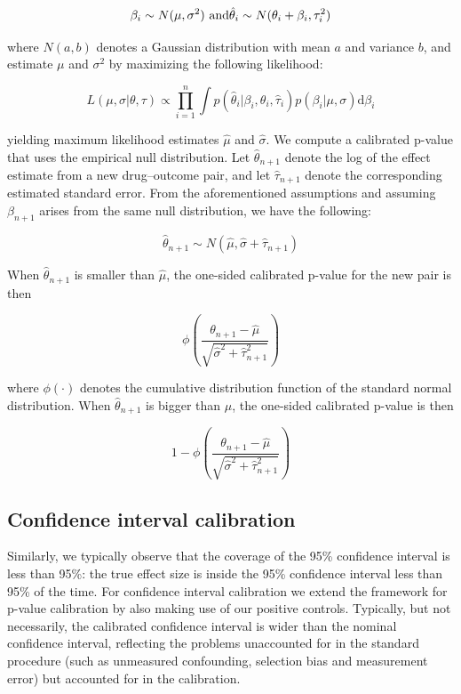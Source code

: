 \documentclass[11pt]{book}
\theoremstyle{definition}
\theoremstyle{definition}
\theoremstyle{definition}
\theoremstyle{remark}
\begin{document}
\[\beta_i \sim N(\mu,\sigma^2) \text{  and} \\ \hat{\theta}_i \sim N(\theta_i + \beta_i, \tau_i^2)\]

where \(N(a,b)\) denotes a Gaussian distribution with mean \(a\) and variance \(b\), and estimate \(\mu\) and \(\sigma^2\) by maximizing the following likelihood:

\[L(\mu, \sigma | \theta, \tau) \propto \prod_{i=1}^{n}\int p(\hat{\theta}_i|\beta_i, \theta_i, \hat{\tau}_i)p(\beta_i|\mu, \sigma) \text{d}\beta_i\]

yielding maximum likelihood estimates \(\hat{\mu}\) and \(\hat{\sigma}\). We compute a calibrated p-value that uses the empirical null distribution. Let \(\hat{\theta}_{n+1}\) denote the log of the effect estimate from a new drug--outcome pair, and let \(\hat{\tau}_{n+1}\) denote the corresponding estimated standard error. From the aforementioned assumptions and assuming \(\beta_{n+1}\) arises from the same null distribution, we have the following:

\[\hat{\theta}_{n+1} \sim N(\hat{\mu}, \hat{\sigma} + \hat{\tau}_{n+1})\]

When \(\hat{\theta}_{n+1}\) is smaller than \(\hat{\mu}\), the one-sided calibrated p-value for the new pair is then

\[\phi\left(\frac{\theta_{n+1} - \hat{\mu}}{\sqrt{\hat{\sigma}^2 + \hat{\tau}_{n+1}^2}}\right)\]

where \(\phi(\cdot)\) denotes the cumulative distribution function of the standard normal distribution. When \(\hat{\theta}_{n+1}\) is bigger than \(\hat{\mu}\), the one-sided calibrated p-value is then

\[1-\phi\left(\frac{\theta_{n+1} - \hat{\mu}}{\sqrt{\hat{\sigma}^2 + \hat{\tau}_{n+1}^2}}\right)\]

\hypertarget{confidence-interval-calibration}{%
\subsection{Confidence interval calibration}\label{confidence-interval-calibration}}

Similarly, we typically observe that the coverage of the 95\% confidence interval is less than 95\%: the true effect size is inside the 95\% confidence interval less than 95\% of the time. For confidence interval calibration \citep{schuemie_2018} we extend the framework for p-value calibration by also making use of our positive controls. Typically, but not necessarily, the calibrated confidence interval is wider than the nominal confidence interval, reflecting the problems unaccounted for in the standard procedure (such as unmeasured confounding, selection bias and measurement error) but accounted for in the calibration.
\end{document}
